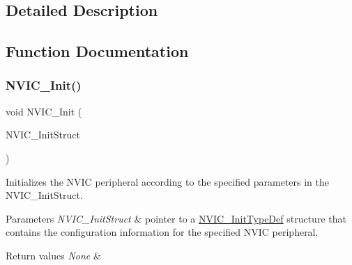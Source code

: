 \subsection{Detailed Description}


\subsection{Function Documentation}
\mbox{\label{group___m_i_s_c___private___functions_ga4ab373ed0870c06fca5eb51d639adf41}} 
\subsubsection{\texorpdfstring{NVIC\_Init()}{NVIC\_Init()}}
{\footnotesize\ttfamily void N\+V\+I\+C\+\_\+\+Init (\begin{DoxyParamCaption}\item[{\mbox{\hyperlink{struct_n_v_i_c___init_type_def}{N\+V\+I\+C\+\_\+\+Init\+Type\+Def}} $\ast$}]{N\+V\+I\+C\+\_\+\+Init\+Struct }\end{DoxyParamCaption})}



Initializes the N\+V\+IC peripheral according to the specified parameters in the N\+V\+I\+C\+\_\+\+Init\+Struct. 


\begin{DoxyParams}{Parameters}
{\em N\+V\+I\+C\+\_\+\+Init\+Struct} & pointer to a \mbox{\hyperlink{struct_n_v_i_c___init_type_def}{N\+V\+I\+C\+\_\+\+Init\+Type\+Def}} structure that contains the configuration information for the specified N\+V\+IC peripheral. \\
\hline
\end{DoxyParams}

\begin{DoxyRetVals}{Return values}
{\em None} & \\
\hline
\end{DoxyRetVals}
\mbox{\label{group___m_i_s_c___private___functions_gadfb1f34f803ce54c976643db8c484442}} 
